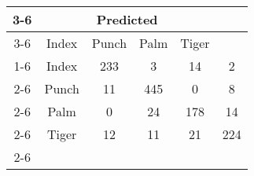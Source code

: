 \documentclass{standalone}
\begin{document}
 
 \begin{tabular}{|c |c |c |c |c |c |}
\cline{3-6}\multicolumn{2}{c|}{} & \multicolumn{4}{c|}{Predicted} \\ 
\cline{3-6} \multicolumn{2}{c |}{ } & Index & Punch & Palm & Tiger\\ 
\cline{1-6}\multirow{4}{*}{\rotatebox[origin=c]{90}{Actual}} & Index & 233 & 3 & 14 & 2\\ 
 \cline{2-6} & Punch & 11 & 445 & 0 & 8\\ 
 \cline{2-6} & Palm & 0 & 24 & 178 & 14\\ 
 \cline{2-6} & Tiger & 12 & 11 & 21 & 224\\ 
 \cline{2-6}\hline \end{tabular}
 
\end{document}
